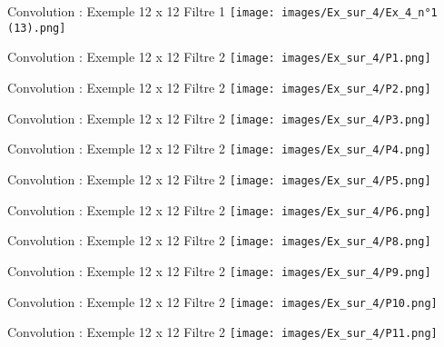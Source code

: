 \documentclass{beamer}
\begin{document}
\begin{frame}{Convolution : Exemple 12 x 12 Filtre 1}
    \texttt{[image: images/Ex\_sur\_4/Ex\_4\_n°1 (13).png]}
\end{frame}

\begin{frame}{Convolution : Exemple 12 x 12 Filtre 2}
    \texttt{[image: images/Ex\_sur\_4/P1.png]}
\end{frame}

\begin{frame}{Convolution : Exemple 12 x 12 Filtre 2}
    \texttt{[image: images/Ex\_sur\_4/P2.png]}
\end{frame}

\begin{frame}{Convolution : Exemple 12 x 12 Filtre 2}
    \texttt{[image: images/Ex\_sur\_4/P3.png]}
\end{frame}

\begin{frame}{Convolution : Exemple 12 x 12 Filtre 2}
    \texttt{[image: images/Ex\_sur\_4/P4.png]}
\end{frame}

\begin{frame}{Convolution : Exemple 12 x 12 Filtre 2}
    \texttt{[image: images/Ex\_sur\_4/P5.png]}
\end{frame}

\begin{frame}{Convolution : Exemple 12 x 12 Filtre 2}
    \texttt{[image: images/Ex\_sur\_4/P6.png]}
\end{frame}

\begin{frame}{Convolution : Exemple 12 x 12 Filtre 2}
    \texttt{[image: images/Ex\_sur\_4/P8.png]}
\end{frame}

\begin{frame}{Convolution : Exemple 12 x 12 Filtre 2}
    \texttt{[image: images/Ex\_sur\_4/P9.png]}
\end{frame}

\begin{frame}{Convolution : Exemple 12 x 12 Filtre 2}
    \texttt{[image: images/Ex\_sur\_4/P10.png]}
\end{frame}

\begin{frame}{Convolution : Exemple 12 x 12 Filtre 2}
    \texttt{[image: images/Ex\_sur\_4/P11.png]}
\end{frame}
\end{document}
